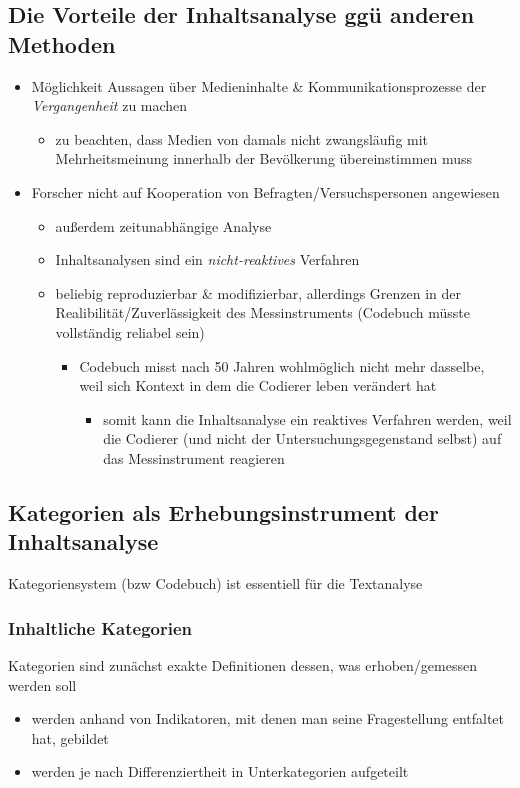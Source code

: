 \documentclass[11pt]{article}
\begin{document}
\subsection{Die Vorteile der Inhaltsanalyse ggü anderen Methoden}
\label{sec:org891a0ba}
\begin{itemize}
\item Möglichkeit Aussagen über Medieninhalte \& Kommunikationsprozesse der \emph{Vergangenheit} zu machen
\begin{itemize}
\item zu beachten, dass Medien von damals nicht zwangsläufig mit Mehrheitsmeinung innerhalb der Bevölkerung übereinstimmen muss
\end{itemize}
\item Forscher nicht auf Kooperation von Befragten/Versuchspersonen angewiesen
\begin{itemize}
\item außerdem zeitunabhängige Analyse
\item Inhaltsanalysen sind ein \emph{nicht-reaktives} Verfahren
\item beliebig reproduzierbar \& modifizierbar, allerdings Grenzen in der Realibilität/Zuverlässigkeit des Messinstruments (Codebuch müsste vollständig reliabel sein)
\begin{itemize}
\item Codebuch misst nach 50 Jahren wohlmöglich nicht mehr dasselbe, weil sich Kontext in dem die Codierer leben verändert hat
\begin{itemize}
\item somit kann die Inhaltsanalyse ein reaktives Verfahren werden, weil die Codierer (und nicht der Untersuchungsgegenstand selbst) auf das Messinstrument reagieren
\end{itemize}
\end{itemize}
\end{itemize}
\end{itemize}
\subsection{Kategorien als Erhebungsinstrument der Inhaltsanalyse}
\label{sec:org994865a}
Kategoriensystem (bzw Codebuch) ist essentiell für die Textanalyse
\subsubsection{Inhaltliche Kategorien}
\label{sec:org136a633}
Kategorien sind zunächst exakte Definitionen dessen, was erhoben/gemessen werden soll
\begin{itemize}
\item werden anhand von Indikatoren, mit denen man seine Fragestellung entfaltet hat, gebildet
\item werden je nach Differenziertheit in Unterkategorien aufgeteilt
\end{itemize}
\end{document}
